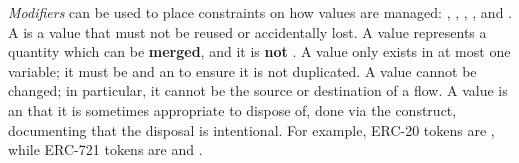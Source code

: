 \documentclass[nonacm, dvipsnames, sigconf]{acmart}
\begin{document}
\emph{Modifiers} can be used to place constraints on how values are managed: , , , , and .
A  is a value that must not be reused or accidentally lost.
A  value represents a quantity which can be \textbf{merged}, and it is \textbf{not} .
A  value only exists in at most one variable; it must be  and an  to ensure it is not duplicated.
A  value cannot be changed; in particular, it cannot be the source or destination of a flow.
A  value is an  that it is sometimes appropriate to dispose of, done via the  construct, documenting that the disposal is intentional.
For example, ERC-20 tokens are , while ERC-721 tokens are  and .
%
\end{document}
